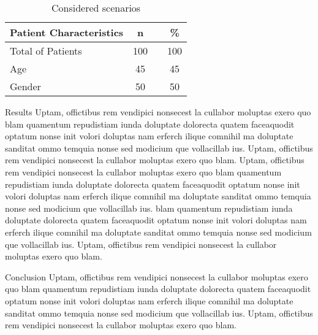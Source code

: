 \documentclass[final]{beamer}
\newlength{\onecolwid}
\begin{document}
\begin{frame}[t]
\begin{columns}[t]
\begin{column}{\onecolwid}
				\begin{table}[ht]
					\centering
					\begin{tabular}{lccc}
						Patient Characteristics & n 		& & \%  \\
						\hline
						Total of Patients 		& 100     	& & 100 \\
						Age 	 				&  45      	& &  45 \\
						Gender 					&  50 	   	& &  50 \\
						\hline
					\end{tabular}
					\caption{Considered scenarios} 
					\label{Patient and tumor Characteristics}
				\end{table}
				
				
				\begin{block}{Results}
					Uptam, offictibus rem vendipici nonsecest la cullabor moluptas exero quo blam quamentum repudistiam iunda doluptate dolorecta quatem faceaquodit optatum nonse init volori doluptas nam erferch ilique comnihil ma doluptate sanditat ommo temquia nonse sed modicium que vollacillab ius. Uptam, offictibus rem vendipici nonsecest la cullabor moluptas exero quo blam.
					Uptam, offictibus rem vendipici nonsecest la cullabor moluptas exero quo blam quamentum repudistiam iunda doluptate dolorecta quatem faceaquodit optatum nonse init volori doluptas nam erferch ilique comnihil ma doluptate sanditat ommo temquia nonse sed modicium que vollacillab ius. 
					blam quamentum repudistiam iunda doluptate dolorecta quatem faceaquodit optatum nonse init volori doluptas nam erferch ilique comnihil ma doluptate sanditat ommo temquia nonse sed modicium que vollacillab ius. Uptam, offictibus rem vendipici nonsecest la cullabor moluptas exero quo blam.
					
				\end{block}
				
				
				\begin{block}{Conclusion}
					Uptam, offictibus rem vendipici nonsecest la cullabor moluptas exero quo blam quamentum repudistiam iunda doluptate dolorecta quatem faceaquodit optatum nonse init volori doluptas nam erferch ilique comnihil ma doluptate sanditat ommo temquia nonse sed modicium que vollacillab ius. Uptam, offictibus rem vendipici nonsecest la cullabor moluptas exero quo blam.
				\end{block}
				

\end{column}
\end{columns}
\end{frame}
\end{document}
